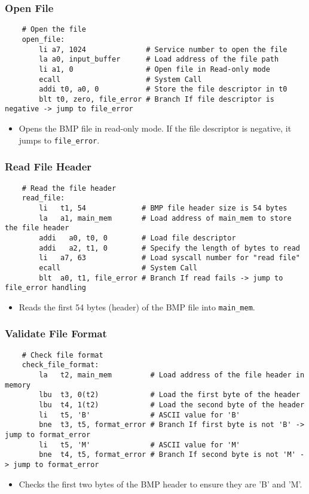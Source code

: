 \documentclass{article}
\begin{document}
\subsubsection{Open File}
\begin{verbatim}
    # Open the file
    open_file:
        li a7, 1024              # Service number to open the file    
        la a0, input_buffer      # Load address of the file path 
        li a1, 0                 # Open file in Read-only mode
        ecall                    # System Call
        addi t0, a0, 0           # Store the file descriptor in t0
        blt t0, zero, file_error # Branch If file descriptor is negative -> jump to file_error
\end{verbatim}
\begin{itemize}
    \item Opens the BMP file in read-only mode. If the file descriptor is negative, it jumps to \texttt{file_error}.
\end{itemize}
\subsubsection{Read File Header}
\begin{verbatim}
    # Read the file header
    read_file:
        li   t1, 54             # BMP file header size is 54 bytes
        la   a1, main_mem       # Load address of main_mem to store the file header
        addi   a0, t0, 0        # Load file descriptor
        addi   a2, t1, 0        # Specify the length of bytes to read
        li   a7, 63             # Load syscall number for "read file"
        ecall                   # System Call
        blt  a0, t1, file_error # Branch If read fails -> jump to file_error handling
\end{verbatim}
\begin{itemize}
    \item Reads the first 54 bytes (header) of the BMP file into \texttt{main_mem}.
\end{itemize}
\subsubsection{Validate File Format}
\begin{verbatim}
    # Check file format
    check_file_format:
        la   t2, main_mem         # Load address of the file header in memory
        lbu  t3, 0(t2)            # Load the first byte of the header 
        lbu  t4, 1(t2)            # Load the second byte of the header 
        li   t5, 'B'              # ASCII value for 'B'
        bne  t3, t5, format_error # Branch If first byte is not 'B' -> jump to format_error 
        li   t5, 'M'              # ASCII value for 'M'
        bne  t4, t5, format_error # Branch If second byte is not 'M' -> jump to format_error 
\end{verbatim}
\begin{itemize}
    \item Checks the first two bytes of the BMP header to ensure they are 'B' and 'M'.
\end{itemize}
\end{document}

